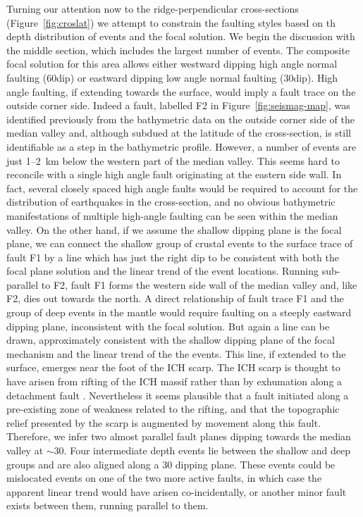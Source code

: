 \documentclass[jgr]{agu2001}
\newlength{\tw}
\begin{document}
\begin{article}
Turning our attention now to the ridge-perpendicular cross-sections
(Figure~\ref{fig:croslat}) we  attempt to constrain the faulting
styles based on th depth distribution of events and the focal solution.
We begin the discussion with the middle section, which includes the
largest number of events.  The composite focal solution for this area
allows either westward dipping high angle normal faulting (60\dg dip)
or eastward dipping low angle normal faulting (30\dg dip).  High angle
faulting, if extending towards the surface, would imply a fault trace
on the outside corner side.  Indeed a fault,
labelled F2 in Figure~\ref{fig:seismag-map}, was identified previously
from the
bathymetric data on the outside corner side of the median valley
\citep{reston02} and, although subdued at the latitude of the
cross-section, is still identifiable as a step in the bathymetric
profile. However, a number of events are just 1--2~km below the
western part of the median valley. This seems hard to reconcile with a
single high angle fault originating at the eastern side wall.  In
fact, several closely spaced high angle faults would be required to account
for the distribution of earthquakes in the cross-section, and no
obvious bathymetric manifestations of multiple high-angle faulting
can be seen within the median valley.  On the other hand, if we assume
the shallow dipping plane is the focal plane, we can connect the
shallow group of crustal events to the surface trace of fault F1
by a line which has just the right dip to be consistent with both the focal
plane solution and the linear trend of the event locations. Running
sub-parallel to F2, fault F1 forms the western side wall of the median
valley \citep{reston02} and, like F2, dies out towards the north.  A
direct relationship of fault trace F1 and the group of deep events in
the mantle would require faulting on a steeply eastward dipping
plane, inconsistent with the focal solution.  But again a line can be
drawn, approximately consistent with the shallow dipping plane of the
focal mechanism and the linear trend of the the events. This line, if
extended to the surface, emerges near the foot of the ICH scarp.  The
ICH scarp is thought to have arisen from rifting of the ICH massif
rather than by exhumation along a detachment fault
\citep{reston02}.  Nevertheless it seems plausible that a fault
initiated along a pre-existing zone of weakness related to the
rifting, and that the topographic relief presented by the scarp is
augmented by movement along this fault. Therefore, we infer two almost
parallel fault planes dipping towards the median valley at $\sim$30\dg.
Four intermediate depth events
lie between the shallow and deep groups and are also aligned along a
30{\dg} dipping plane.  These events could be mislocated events on one
of the two more active faults, in
which case the apparent linear trend would have arisen
co-incidentally, or another minor fault exists between them, running parallel to them.


\end{article}
\end{document}

